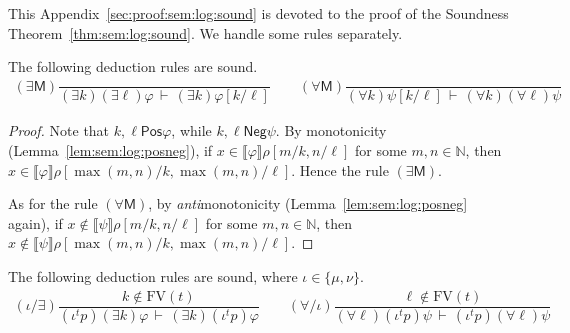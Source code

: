 \documentclass[%
  a4paper,
  UKenglish,
  cleveref,
  autoref,
  thm-restate,
  numberwithinsect,
]{lipics-v2021}
\newcommand\thesis{\vdash}
\newcommand\NN{\mathbb{N}}
\newcommand\I[1]{\llbracket #1 \rrbracket} %
\newcommand\ax[1]{(\mathsf{#1})}
\newcommand\val{\rho}	%
\newcommand\FV{\mathrm{FV}}
\newcommand\term[1]{\mathsf{#1}}
\newcommand\itvar{k}
\newcommand\itvarbis{\ell}
\newcommand\Pos{\mathrel{\term{Pos}}}
\newcommand\Neg{\mathrel{\term{Neg}}}
\newcommand\FP{p}
\newcommand\finmu{\mu}
\newcommand\finnu{\nu}
\newcommand\fingen{\iota}
\begin{document}
This Appendix~\ref{sec:proof:sem:log:sound}
is devoted to the proof of the Soundness Theorem~\ref{thm:sem:log:sound}.
We handle some rules separately.



\begin{lemma}
\label{lem:proof:sem:log:sound:mergequant}
The following deduction rules are sound.
\[
\begin{array}{c}
%
\ax{\exists M}
\dfrac{}
  {(\exists \itvar)(\exists \itvarbis)\varphi
  \,\thesis\,
  (\exists \itvar)\varphi[\itvar / \itvarbis]}
%
\qquad
%
\ax{\forall M}
\dfrac{}
  {(\forall \itvar)\psi[\itvar / \itvarbis]
  \,\thesis\,
  (\forall \itvar)(\forall \itvarbis)\psi}
%
\end{array}
\]
\end{lemma}

\begin{proof}
Note that $\itvar, \itvarbis \Pos \varphi$,
while $\itvar, \itvarbis \Neg \psi$.
By monotonicity (Lemma~\ref{lem:sem:log:posneg}),
if $x \in \I\varphi\val[m / \itvar, n / \itvarbis]$
for some $m, n \in \NN$,
then $x \in \I\varphi\val[\max(m,n) / \itvar, \max(m,n) / \itvarbis]$.
Hence the rule $\ax{\exists M}$.

As for the rule $\ax{\forall M}$,
by \emph{anti}monotonicity
(Lemma~\ref{lem:sem:log:posneg} again),
if
$x \notin \I\psi\val[m / \itvar, n / \itvarbis]$
for some $m, n \in \NN$,
then 
$x \notin \I\psi\val[\max(m,n) / \itvar, \max(m,n) / \itvarbis]$.
\end{proof}




\begin{lemma}
\label{lem:proof:sem:log:sound:fixquant}
The following deduction rules are sound,
where $\fingen \in \{\finmu, \finnu\}$.
\[
\begin{array}{c}
%
\ax{\fingen/\exists}
\dfrac{\itvar \notin \FV(t)}
  {(\fingen^t \FP)(\exists \itvar)\varphi
  \,\thesis\,
  (\exists \itvar)(\fingen^t \FP)\varphi}
%
\qquad
%
\ax{\forall/\fingen}
\dfrac{\itvarbis \notin \FV(t)}
  {(\forall \itvarbis)(\fingen^t \FP)\psi
  \,\thesis\,
  (\fingen^t \FP)(\forall \itvarbis)\psi}
%
\end{array}
\]
\end{lemma}
\end{document}
